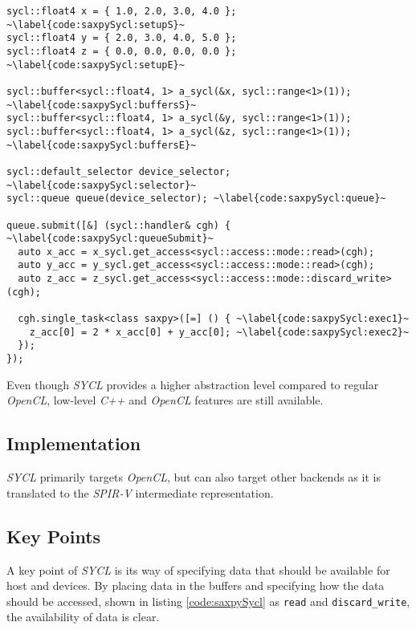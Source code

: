 \begin{lstlisting}[caption={\textit{SAXPY} implemented in \textit{SYCL}.}, label={code:saxpySycl}]
sycl::float4 x = { 1.0, 2.0, 3.0, 4.0 }; ~\label{code:saxpySycl:setupS}~
sycl::float4 y = { 2.0, 3.0, 4.0, 5.0 };
sycl::float4 z = { 0.0, 0.0, 0.0, 0.0 }; ~\label{code:saxpySycl:setupE}~

sycl::buffer<sycl::float4, 1> a_sycl(&x, sycl::range<1>(1)); ~\label{code:saxpySycl:buffersS}~
sycl::buffer<sycl::float4, 1> a_sycl(&y, sycl::range<1>(1));
sycl::buffer<sycl::float4, 1> a_sycl(&z, sycl::range<1>(1)); ~\label{code:saxpySycl:buffersE}~

sycl::default_selector device_selector; ~\label{code:saxpySycl:selector}~
sycl::queue queue(device_selector); ~\label{code:saxpySycl:queue}~

queue.submit([&] (sycl::handler& cgh) { ~\label{code:saxpySycl:queueSubmit}~
  auto x_acc = x_sycl.get_access<sycl::access::mode::read>(cgh);
  auto y_acc = y_sycl.get_access<sycl::access::mode::read>(cgh);
  auto z_acc = z_sycl.get_access<sycl::access::mode::discard_write>(cgh);

  cgh.single_task<class saxpy>([=] () { ~\label{code:saxpySycl:exec1}~
    z_acc[0] = 2 * x_acc[0] + y_acc[0]; ~\label{code:saxpySycl:exec2}~
  });
});
\end{lstlisting}

Even though \textit{SYCL} provides a higher abstraction level compared to regular \textit{OpenCL}, low-level \textit{C++} and \textit{OpenCL} features are still available.

\subsection{Implementation}
\textit{SYCL} primarily targets \textit{OpenCL}, but can also target other backends as it is translated to the \textit{SPIR-V} intermediate representation.

\subsection{Key Points}
A key point of \textit{SYCL} is its way of specifying data that should be available for host and devices. By placing data in the buffers and specifying how the data should be accessed, shown in listing \ref{code:saxpySycl} as \texttt{read} and \texttt{discard\_write}, the availability of data is clear. 
